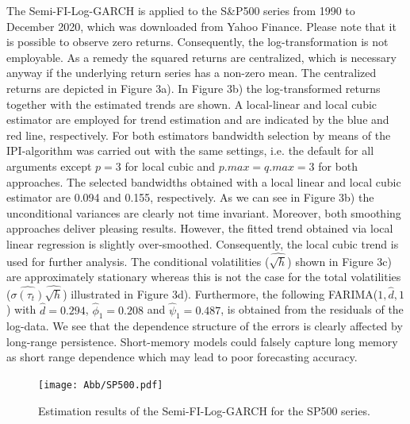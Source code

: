 \documentclass[12pt]{article}
\begin{document}
The Semi-FI-Log-GARCH is applied to the S\&P500 series from 1990 to December 2020, which was downloaded from Yahoo Finance. Please note that it is possible to observe zero returns. Consequently, the log-transformation is not employable. As a remedy the squared returns are centralized, which is necessary anyway if the underlying return series has a non-zero mean. The centralized returns are depicted in Figure 3a). In Figure 3b) the log-transformed returns together with the estimated trends are shown. A local-linear and local cubic estimator are employed for trend estimation and are indicated by the blue and red line, respectively. For both estimators bandwidth selection by means of the IPI-algorithm was carried out with the same settings, i.e. the default for all arguments except $\textit{p} = 3$ for local cubic and $\textit{p.max} = \textit{q.max} = 3$ for both approaches. The selected bandwidths obtained with a local linear and local cubic estimator are 0.094 and 0.155, respectively. As we can see in Figure 3b) the unconditional variances are clearly not time invariant. Moreover, both smoothing approaches deliver pleasing results. However, the fitted trend obtained via local linear regression is slightly over-smoothed. Consequently, the local cubic trend is used for further analysis. The conditional volatilities ($\hat{\sqrt{h}}$) shown in Figure 3c) are approximately stationary whereas this is not the case for the total volatilities ($\hat{\sigma(\tau_t)}\hat{\sqrt{h}}$) illustrated in Figure 3d). Furthermore, the following FARIMA($1, \hat{d}, 1$) with $\hat{d} = 0.294$, $\hat{\phi}_1 = 0.208$ and $\hat{\psi}_1 = 0.487$,  is obtained from the residuals of the log-data.
We see that the dependence structure of the errors is clearly affected by long-range persistence. Short-memory models could falsely capture long memory as short range dependence which may lead to poor forecasting accuracy.

\begin{figure}[h!]
	\texttt{[image: Abb/SP500.pdf]}
	\caption{Estimation results of the Semi-FI-Log-GARCH for the SP500 series.}
\end{figure} 
\end{document}
